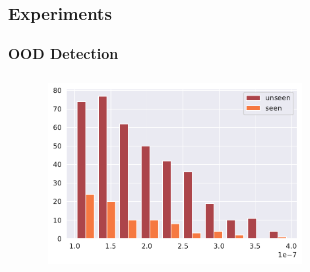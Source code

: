 \documentclass[9pt]{beamer}
\begin{document}
\begin{frame}
\frametitle{Experiments}
\framesubtitle{OOD Detection}
\begin{figure}
	\centering
	\includegraphics[width=0.6\textwidth]{images/zero_shot_class_uncertainty_median_hist.pdf}
\end{figure}
\end{frame} 
\end{document}
